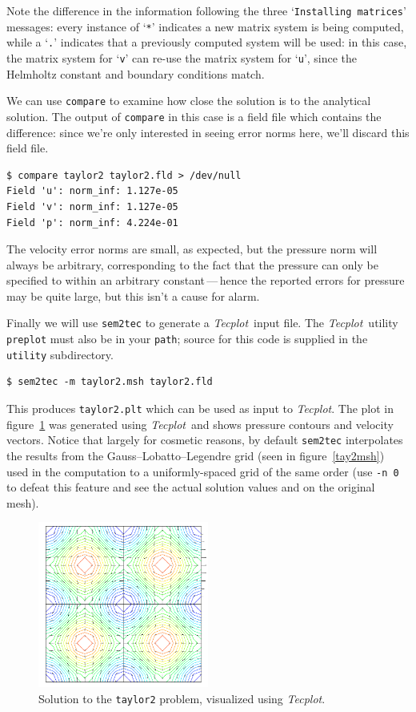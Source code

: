 \documentclass[11pt]{report}
\newcommand{\Tecplot}{\emph{Tecplot}}
\begin{document}
Note the difference in the information following the three
`\verb|Installing matrices|' messages: every instance of `\verb|*|'
indicates a new matrix system is being computed, while a `\verb|.|'
indicates that a previously computed system will be used: in this
case, the matrix system for `\verb|v|' can re-use the matrix system
for `\verb|u|', since the Helmholtz constant and boundary conditions
match.

We can use \texttt{compare} to examine how close the solution is to the
analytical solution.  The output of \texttt{compare} in this case
is a field file which contains the difference: since we're only interested
in seeing error norms here, we'll discard this field file.
{\small
\begin{verbatim}
$ compare taylor2 taylor2.fld > /dev/null
Field 'u': norm_inf: 1.127e-05
Field 'v': norm_inf: 1.127e-05
Field 'p': norm_inf: 4.224e-01
\end{verbatim}
}
\noindent
The velocity error norms are small, as expected, but the pressure norm
will always be arbitrary, corresponding to the fact that the pressure
can only be specified to within an arbitrary constant\,---\,hence the
reported errors for pressure may be quite large, but this isn't a
cause for alarm.

Finally we will use \texttt{sem2tec} to generate a \Tecplot\ input
file.  The \Tecplot\ utility \texttt{preplot} must also be in your
\texttt{path}; source for this code is supplied in the \verb|utility|
subdirectory.  {\small
\begin{verbatim}
$ sem2tec -m taylor2.msh taylor2.fld
\end{verbatim}
}
\noindent
This produces \texttt{taylor2.plt} which can be used as input to
\Tecplot.  The plot in figure~\ref{tay2soln} was generated using
\Tecplot\ and shows pressure contours and velocity vectors.  Notice
that largely for cosmetic reasons, by default \texttt{sem2tec}
interpolates the results from the Gauss--Lobatto--Legendre grid (seen
in figure~\ref{tay2msh}) used in the computation to a uniformly-spaced
grid of the same order (use \verb|-n 0| to defeat this feature and
see the actual solution values and on the original mesh).

\begin{figure}
\begin{center}
\includegraphics[width=0.5\textwidth]{taylor2}
\end{center}
\caption{
\label{tay2soln}
  Solution to the \texttt{taylor2} problem, visualized using \Tecplot.
}
\end{figure}
\end{document}
